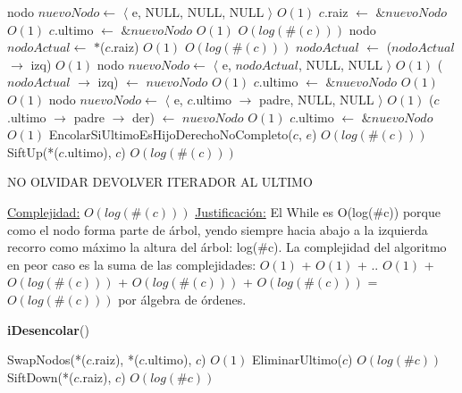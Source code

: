 \begin{Algoritmos}
\begin{algorithmic}[1]
        \State nodo $nuevoNodo \gets$ $\langle$ e, NULL, NULL, NULL $\rangle$   \Comment $O(1)$
        \State $c$.raiz $\gets$ $\& nuevoNodo$ \Comment $O(1)$
        \State $c$.ultimo $\gets$ $\& nuevoNodo$ \Comment $O(1)$
    \Else
          \Comment $O(log(\#(c)))$
            \State nodo $nodoActual \gets$ $*$($c$.raiz) \Comment $O(1)$
              \Comment $O(log(\#(c)))$
                \State $nodoActual$ $\gets$ ($nodoActual$ $\to$ izq)  \Comment $O(1)$
            \EndWhile
            \State nodo $nuevoNodo \gets$ $\langle$ e, $nodoActual$, NULL, NULL $\rangle$   \Comment $O(1)$
            \State ($nodoActual$ $\to$ izq) $\gets$ $nuevoNodo$ \Comment $O(1)$
            \State $c$.ultimo $\gets$ $\& nuevoNodo$ \Comment $O(1)$
        \Else
              \Comment $O(1)$
                \State nodo $nuevoNodo \gets$ $\langle$ e, $c$.ultimo $\to$ padre, NULL, NULL $\rangle$   \Comment $O(1)$
                \State ($c$.ultimo $\to$ padre $\to$ der) $\gets$ $nuevoNodo$ \Comment $O(1)$
                \State $c$.ultimo $\gets$ $\& nuevoNodo$ \Comment $O(1)$
            \Else %
                \State EncolarSiUltimoEsHijoDerechoNoCompleto($c$, $e$) \Comment $O(log(\#(c)))$
            \EndIf
        \EndIf
    \EndIf
    \State $ $
    \State SiftUp(*($c$.ultimo), $c$) \Comment $O(log(\#(c)))$

    NO OLVIDAR DEVOLVER ITERADOR AL ULTIMO

    \medskip
    \Statex \underline{Complejidad:} $O(log(\#(c)))$
    \Statex \underline{Justificaci\'on:} El While es O(log($\#$c)) porque como el nodo forma parte de \'arbol, yendo siempre hacia abajo a la izquierda recorro como m\'aximo la altura del \'arbol: log($\#$c). La complejidad del algoritmo en peor caso es la suma de las complejidades: $O(1)$ + $O(1)$ + .. $O(1)$ + $O(log(\#(c)))$ + $O(log(\#(c)))$ + $O(log(\#(c)))$ = $O(log(\#(c)))$ por \'algebra de \'ordenes.
\end{algorithmic}


\begin{algorithm}[H]
{\textbf{iDesencolar}()}
\begin{algorithmic}[1]
    
    \State SwapNodos(*($c$.raiz), *($c$.ultimo), $c$) \Comment $O(1)$
    \State EliminarUltimo($c$) \Comment $O(log(\#c))$
    \State SiftDown(*($c$.raiz), $c$) \Comment $O(log(\#c))$
    

\end{algorithmic}
\end{algorithm}
\end{Algoritmos}
